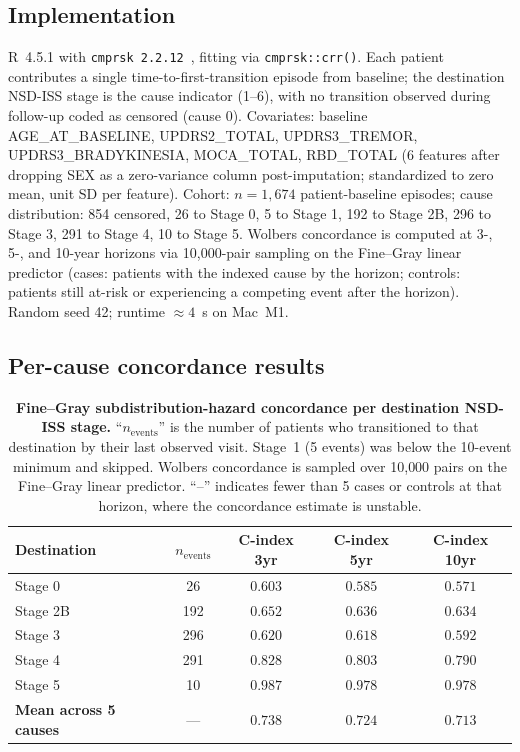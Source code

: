 \documentclass[11pt]{article}
\begin{document}
\subsection*{Implementation}

R~4.5.1 with \texttt{cmprsk 2.2.12}~\cite{gray2014cmprsk}, fitting via \texttt{cmprsk::crr()}. Each patient contributes a single time-to-first-transition episode from baseline; the destination NSD-ISS stage is the cause indicator (1--6), with no transition observed during follow-up coded as censored (cause 0). Covariates: baseline AGE\_AT\_BASELINE, UPDRS2\_TOTAL, UPDRS3\_TREMOR, UPDRS3\_BRADYKINESIA, MOCA\_TOTAL, RBD\_TOTAL (6 features after dropping SEX as a zero-variance column post-imputation; standardized to zero mean, unit SD per feature). Cohort: $n{=}1{,}674$ patient-baseline episodes; cause distribution: 854 censored, 26 to Stage 0, 5 to Stage 1, 192 to Stage 2B, 296 to Stage 3, 291 to Stage 4, 10 to Stage 5. Wolbers concordance is computed at 3-, 5-, and 10-year horizons via 10{,}000-pair sampling on the Fine--Gray linear predictor (cases: patients with the indexed cause by the horizon; controls: patients still at-risk or experiencing a competing event after the horizon). Random seed 42; runtime $\approx 4$~s on Mac~M1.

\subsection*{Per-cause concordance results}

\begin{table}[h!]
\centering
\caption{\textbf{Fine--Gray subdistribution-hazard concordance per destination NSD-ISS stage.} ``$n_\mathrm{events}$'' is the number of patients who transitioned to that destination by their last observed visit. Stage~1 (5 events) was below the 10-event minimum and skipped. Wolbers concordance is sampled over 10{,}000 pairs on the Fine--Gray linear predictor. ``--'' indicates fewer than 5 cases or controls at that horizon, where the concordance estimate is unstable.}
\label{tab:s_wsp37c_finegray}
\begin{tabular}{lcccc}
\toprule
\textbf{Destination} & \textbf{$n_\mathrm{events}$} & \textbf{C-index 3yr} & \textbf{C-index 5yr} & \textbf{C-index 10yr} \\
\midrule
Stage 0  & 26  & $0.603$ & $0.585$ & $0.571$ \\
Stage 2B & 192 & $0.652$ & $0.636$ & $0.634$ \\
Stage 3  & 296 & $0.620$ & $0.618$ & $0.592$ \\
Stage 4  & 291 & $0.828$ & $0.803$ & $0.790$ \\
Stage 5  & 10  & $0.987$ & $0.978$ & $0.978$ \\
\midrule
\textbf{Mean across 5 causes} & --- & $\mathbf{0.738}$ & $\mathbf{0.724}$ & $\mathbf{0.713}$ \\
\bottomrule
\end{tabular}
\end{table}
\end{document}
